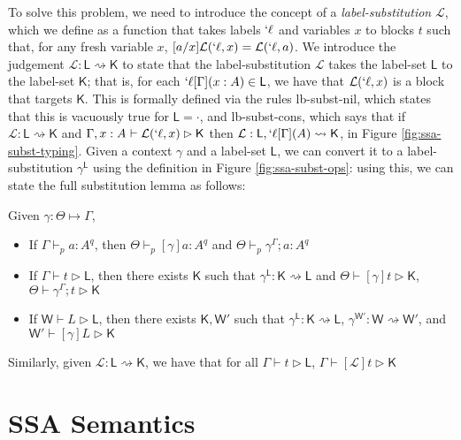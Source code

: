 \documentclass[acmsmall,screen,review]{acmart}
\newcommand{\mc}[1]{\ensuremath{\mathcal{#1}}}
\newcommand{\ms}[1]{\ensuremath{\mathsf{#1}}}
\newcommand{\lbl}[1]{{`#1}}
\newcommand{\thyp}[3]{#1: {#2}^{#3}}
\newcommand{\lhyp}[3]{#1[#2](#3)}
\newcommand{\rle}[1]{{\scriptsize\textsf{#1}}}
\newcommand{\hasty}[5]{#1 \vdash_{#2} #3: {#4}^{#5}}
\newcommand{\haslb}[3]{#1 \vdash #2 \rhd #3}
\newcommand{\lhaslb}[3]{#1 \vdash #2 \rhd #3}
\newcommand{\issubst}[3]{#1: #2 \mapsto #3}
\newcommand{\lbsubst}[3]{#1: #2 \rightsquigarrow #3}
\newcommand{\exprletsubst}[2]{{#1};{#2}}
\newcommand{\stmtletsubst}[2]{{#1};{#2}}
\newcommand{\substctx}[2]{{#1}^{#2}}
\newcommand{\substlbs}[2]{{#1}^{#2}}
\begin{document}
To solve this problem, we need to introduce the concept of a
\textit{label-substitution} \(\mc{L}\), which we define as a function that takes
labels \(\lbl{\ell}\) and variables \(x\) to blocks \(t\) such that, for any
fresh variable \(x\), \([a/x]\mc{L}(\lbl{\ell}, x) = \mc{L}(\lbl{\ell}, a)\). We
introduce the judgement \(\lbsubst{\mc{L}}{\ms{L}}{\ms{K}}\) to state that the
label-substitution \(\mc{L}\) takes the label-set \(\ms{L}\) to the label-set
\(\ms{K}\); that is, for each \(\lbl{\ell}[\Gamma](x: A) \in \ms{L}\), we have
that \(\mc{L}(\lbl{\ell}, x)\) is a block that targets \(\ms{K}\). This is
formally defined via the rules \rle{lb-subst-nil}, which states that this is
vacuously true for \(\ms{L} = \cdot\), and \rle{lb-subst-cons}, which says that
if \(\lbsubst{\mc{L}}{\ms{L}}{\ms{K}}\) and \(\haslb{\Gamma,
\thyp{x}{A}{}}{\mc{L}(\lbl{\ell}, x)}{\ms{K}}\) then \(\lbsubst{\mc{L}}{\ms{L},
\lhyp{\lbl{\ell}}{\Gamma}{A}}{\ms{K}}\), in Figure \ref{fig:ssa-subst-typing}.
Given a context \(\gamma\) and a label-set \(\ms{L}\), we can convert it to a
label-substitution \(\substlbs{\gamma}{\ms{L}}\) using the definition in Figure
\ref{fig:ssa-subst-ops}: using this, we can state the full substitution lemma as
follows:
\begin{lemma}[Substitution] 
  Given \(\issubst{\gamma}{\Theta}{\Gamma}\),
  \begin{itemize}
    \item If \(\hasty{\Gamma}{p}{a}{A}{q}\), then
    \(\hasty{\Theta}{p}{[\gamma]a}{A}{q}\) and
    \(\hasty{\Theta}{p}{\exprletsubst{\substctx{\gamma}{\Gamma}}{a}}{A}{q}\)
    \item If \(\haslb{\Gamma}{t}{\ms{L}}\), then there exists \(\ms{K}\) such
    that \(\lbsubst{\substlbs{\gamma}{\ms{L}}}{\ms{K}}{\ms{L}}\) and
    \(\haslb{\Theta}{[\gamma]t}{\ms{K}}\),
    \(\haslb{\Theta}{\stmtletsubst{\substctx{\gamma}{\Gamma}}{t}}{\ms{K}}\)
    \item If \(\lhaslb{\ms{W}}{L}{\ms{L}}\), then there exists \(\ms{K},
    \ms{W}'\) such that \(\lbsubst{\substlbs{\gamma}{\ms{L}}}{\ms{K}}{\ms{L}}\),
    \(\lbsubst{\substlbs{\gamma}{\ms{W}'}}{\ms{W}}{\ms{W}'}\), and
    \(\lhaslb{\ms{W}'}{[\gamma]L}{\ms{K}}\)
  \end{itemize}
  Similarly, given \(\lbsubst{\mc{L}}{\ms{L}}{\ms{K}}\), we have that for all
  \(\haslb{\Gamma}{t}{\ms{L}}\), \(\haslb{\Gamma}{[\mc{L}]t}{\ms{K}}\)
\end{lemma}

\section{SSA Semantics}
\end{document}
